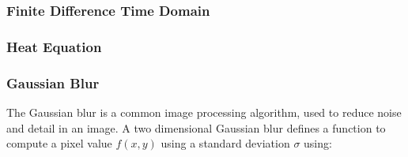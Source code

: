 

\subsubsection{Finite Difference Time Domain}

\subsubsection{Heat Equation}

\subsubsection{Gaussian Blur}

The Gaussian blur is a common image processing algorithm, used to
reduce noise and detail in an image. A two dimensional Gaussian blur
defines a function to compute a pixel value $f(x,y)$ using a standard
deviation $\sigma$ using:

